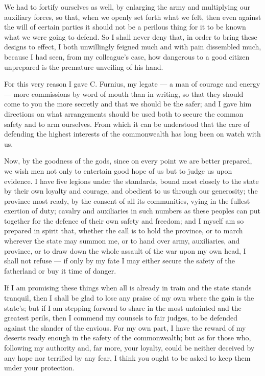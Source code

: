 We had to fortify ourselves as well, by enlarging the army and multiplying our auxiliary forces, so that, when we openly set forth what we felt, then even against the will of certain parties it should not be a perilous thing for it to be known what we were going to defend. So I shall never deny that, in order to bring these designs to effect, I both unwillingly feigned much and with pain dissembled much, because I had seen, from my colleague's case, how dangerous to a good citizen unprepared is the premature unveiling of his hand.

 For this very reason I gave C. Furnius, my legate --- a man of courage and energy --- more commissions by word of mouth than in writing, so that they should come to you the more secretly and that we should be the safer; and I gave him directions on what arrangements should be used both to secure the common safety and to arm ourselves. From which it can be understood that the care of defending the highest interests of the commonwealth has long been on watch with us.

 Now, by the goodness of the gods, since on every point we are better prepared, we wish men not only to entertain good hope of us but to judge us upon evidence. I have five legions under the standards, bound most closely to the state by their own loyalty and courage, and obedient to us through our generosity; the province most ready, by the consent of all its communities, vying in the fullest exertion of duty; cavalry and auxiliaries in such numbers as these peoples can put together for the defence of their own safety and freedom; and I myself am so prepared in spirit that, whether the call is to hold the province, or to march wherever the state may summon me, or to hand over army, auxiliaries, and province, or to draw down the whole assault of the war upon my own head, I shall not refuse --- if only by my fate I may either secure the safety of the fatherland or buy it time of danger.

 If I am promising these things when all is already in train and the state stands tranquil, then I shall be glad to lose any praise of my own where the gain is the state's; but if I am stepping forward to share in the most untainted and the greatest perils, then I commend my counsels to fair judges, to be defended against the slander of the envious. For my own part, I have the reward of my deserts ready enough in the safety of the commonwealth; but as for those who, following my authority and, far more, your loyalty, could be neither deceived by any hope nor terrified by any fear, I think you ought to be asked to keep them under your protection.
